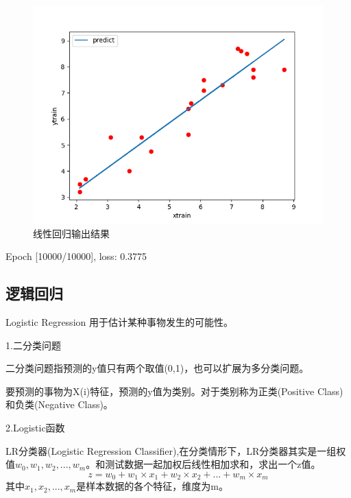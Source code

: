 \documentclass[openbib]{article}
\begin{document}
\begin{figure}[htbp]
	\centering
	\includegraphics[scale=0.4]{线性回归.png}
	\caption{线性回归输出结果}
\end{figure}

Epoch [10000/10000], loss: 0.3775

\subsection{逻辑回归}

Logistic Regression 用于估计某种事物发生的可能性。

1.二分类问题

二分类问题指预测的y值只有两个取值(0,1)，也可以扩展为多分类问题。

要预测的事物为X(i)特征，预测的y值为类别。对于类别称为正类(Positive Class)和负类(Negative Class)。

2.Logistic函数

LR分类器(Logistic Regression Classifier),在分类情形下，LR分类器其实是一组权值$w_{0},w_{1},w_{2},...,w_{m}$。和测试数据一起加权后线性相加求和，求出一个z值。
$$ z = w_{0} + w_{1} \times x_{1} + w_{2} \times x_{2} +...+ w_{m} \times x_{m}$$
其中$x_1, x_2, ...,x_m$是样本数据的各个特征，维度为m。
\end{document}
